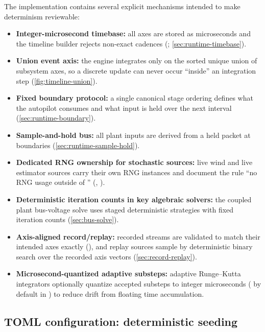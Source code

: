 The implementation contains several explicit mechanisms intended to make determinism reviewable:
\begin{itemize}[leftmargin=*]
  \item \textbf{Integer-microsecond timebase:} all axes are stored as  microseconds and the timeline builder rejects non-exact cadences (; \cref{sec:runtime-timebase}).
  \item \textbf{Union event axis:} the engine integrates only on the sorted unique union of subsystem axes, so a discrete update can never occur ``inside'' an integration step (\cref{fig:timeline-union}).
  \item \textbf{Fixed boundary protocol:} a single canonical stage ordering defines what the autopilot consumes and what input is held over the next interval (\cref{sec:runtime-boundary}).
  \item \textbf{Sample-and-hold bus:} all plant inputs are derived from a held  packet at boundaries (\cref{sec:runtime-sample-hold}).
  \item \textbf{Dedicated RNG ownership for stochastic sources:} live wind and live estimator sources carry their own RNG instances and document the rule ``no RNG usage outside of '' (, ).
  \item \textbf{Deterministic iteration counts in key algebraic solvers:} the coupled plant bus-voltage solve uses staged deterministic strategies with fixed iteration counts (\cref{sec:bus-solve}).
  \item \textbf{Axis-aligned record/replay:} recorded streams are validated to match their intended axes exactly (), and replay sources sample by deterministic binary search over the recorded axis vectors (\cref{sec:record-replay}).
  \item \textbf{Microsecond-quantized adaptive substeps:} adaptive Runge--Kutta integrators optionally quantize accepted substeps to integer microseconds ( by default in ) to reduce drift from floating time accumulation.
\end{itemize}

\subsection{TOML configuration: deterministic seeding}
\label{sec:determinism-toml-seed}

